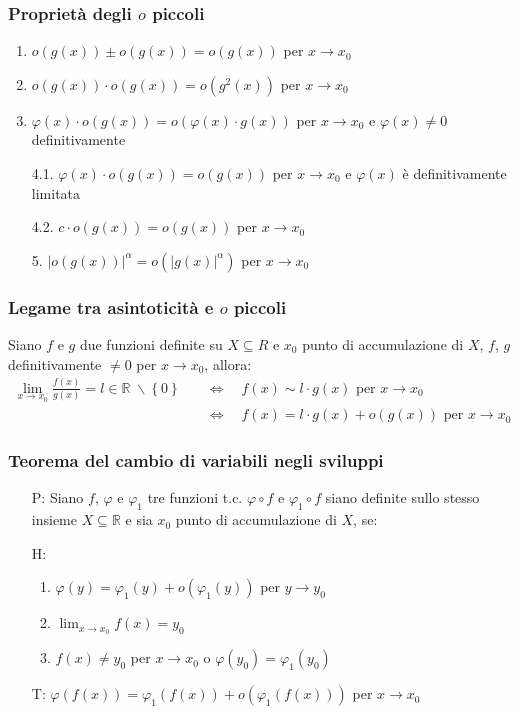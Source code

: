 \documentclass[a4paper]{article}
\begin{document}
\subsubsection*{Proprietà degli \(o\) piccoli}
\begin{enumerate}
	\item \(o(g(x)) \pm o(g(x)) = o(g(x))\) per \(x \to x_0\)
	\item \(o(g(x)) \cdot o(g(x)) = o(g^2(x))\) per \(x \to x_0\)
	\item \(\varphi(x) \cdot o(g(x)) = o(\varphi (x) \cdot g(x))\) per \(x \to x_0\) e \(\varphi(x) \neq 0\) definitivamente
	\item[4.1.] \(\varphi(x) \cdot o(g(x)) = o(g(x))\) per \(x \to x_0\) e \(\varphi(x)\) è definitivamente limitata
	\item[4.2.] \(c \cdot o(g(x)) = o(g(x))\) per \(x \to x_0\)
	\item[5.] \(\left| o(g(x)) \right| ^ \alpha = o(\left| g(x) \right| ^ \alpha)\) per \(x \to x_0\)
\end{enumerate}

\subsubsection*{Legame tra asintoticità e \(o\) piccoli}
Siano \(f\) e \(g\) due funzioni definite su \(X \subseteq R\) e \(x_0\) punto di accumulazione di \(X\), \(f\), \(g\) definitivamente \(\neq 0\) per \(x \to x_0\), allora:
\begin{align*}
	\lim_{x \to x_0} \frac{f(x)}{g(x)} = l \in \mathbb{R} \; \backslash \left\{0\right\} \quad &\Leftrightarrow \quad f(x) \sim l \cdot g(x) \text{ per } x \to x_0 \\
	&\Leftrightarrow \quad f(x) = l \cdot g(x) + o(g(x)) \text{ per } x \to x_0
\end{align*}

\subsubsection*{Teorema del cambio di variabili negli sviluppi}
\begin{itemize}
	\item[P:] Siano \(f\), \(\varphi\) e \(\varphi_1\) tre funzioni t.c. \(\varphi \circ f\) e \(\varphi_1 \circ f\) siano definite sullo stesso
	insieme \(X \subseteq \mathbb{R}\) e sia \(x_0\) punto di accumulazione di \(X\), se:
	\item[H:]
	\begin{enumerate}
		\item \(\varphi(y) = \varphi_1(y) + o(\varphi_1(y))\) per \(y \to y_0\)
		\item \(\displaystyle \lim_{x \to x_0} f(x) = y_0\)
		\item \(f(x) \neq y_0\) per \(x \to x_0\) o \(\varphi(y_0) = \varphi_1(y_0)\)
	\end{enumerate}
	\item[T:] \(\varphi(f(x)) = \varphi_1(f(x)) + o(\varphi_1(f(x)))\) per \(x \to x_0\)
\end{itemize}
\end{document}
